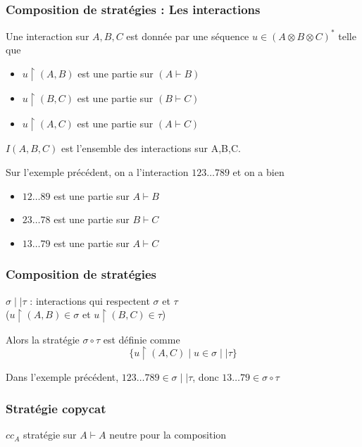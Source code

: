 \documentclass{beamer}
\begin{document}
\begin{frame}
\frametitle{Composition de stratégies : Les interactions}

Une interaction sur $A, B, C$ est donnée par une séquence
$u \in (A \otimes B \otimes C)^*$ telle que
\begin{itemize}
\pause
\item $u \upharpoonright (A, B)$ est une partie sur $(A \vdash B)$
\item $u \upharpoonright (B, C)$ est une partie sur $(B \vdash C)$
\item $u \upharpoonright (A, C)$ est une partie sur $(A \vdash C)$
\end{itemize}

$I(A,B,C)$ est l'ensemble des interactions sur A,B,C.
\pause

Sur l'exemple précédent, on a l'interaction $123\dots 789$
et on a bien
\begin{itemize}
\item $12 \dots 89$ est une partie sur $A \vdash B$
\item $23 \dots 78$ est une partie sur $B \vdash C$
\item $13 \dots 79$ est une partie sur $A \vdash C$
\end{itemize}

\end{frame}

\begin{frame}
\frametitle{Composition de stratégies}


$\sigma \mid\mid \tau$ : interactions qui respectent $\sigma$ et $\tau$\\
($u \upharpoonright (A,B) \in \sigma$ et $u \upharpoonright (B,C) \in \tau$)
\pause

Alors la stratégie $\sigma \circ \tau$ est définie comme
\begin{equation*}\{u \upharpoonright (A, C) \mid u \in \sigma \mid\mid \tau \}\end{equation*}
\pause

Dans l'exemple précédent, $123\dots 789 \in \sigma \mid\mid \tau$, donc $13\dots79 \in \sigma \circ \tau$

\end{frame}


\begin{frame}
\frametitle{Stratégie copycat}

$cc_A$ stratégie sur $A\vdash A$ neutre pour la composition

 

\end{frame}
\end{document}
